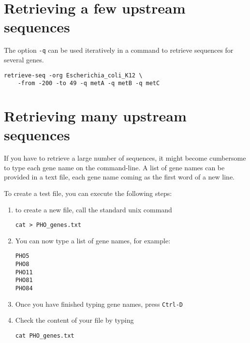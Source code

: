 \section{Retrieving a few upstream sequences}

The option \texttt{-q} can be used iteratively in a command to
retrieve sequences for several genes.

{\color{blue} \begin{footnotesize}
\begin{verbatim}
retrieve-seq -org Escherichia_coli_K12 \
    -from -200 -to 49 -q metA -q metB -q metC
\end{verbatim}\end{footnotesize}}

\section{Retrieving many upstream sequences}

If you have to retrieve a large number of sequences, it might become
cumbersome to type each gene name on the command-line. A list of gene
names can be provided in a text file, each gene name coming as the
first word of a new line.

To create a test file, you can execute the following steps:
\begin{enumerate}
\item to create a new file, call the standard unix command 

{\color{blue} \begin{footnotesize}
\begin{verbatim}
cat > PHO_genes.txt
\end{verbatim}\end{footnotesize}} 

\item You can now type a list of gene names, for example:

{\color{blue} \begin{footnotesize}
\begin{verbatim}
PHO5
PHO8
PHO11
PHO81
PHO84
\end{verbatim}\end{footnotesize}} 

\item Once you have finished typing gene names, press \texttt{Ctrl-D}

\item Check the content of your file by typing 

{\color{blue} \begin{footnotesize}
\begin{verbatim}
cat PHO_genes.txt
\end{verbatim}\end{footnotesize}} 

\end{enumerate}

